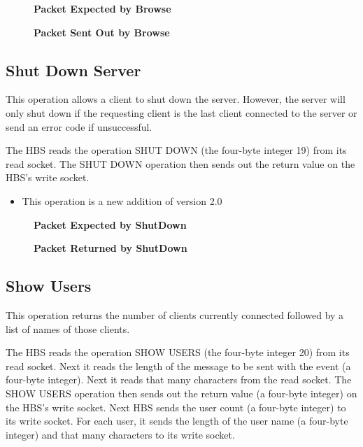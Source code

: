 \begin{figure}[htb]
  \centerline{}
  \caption{{\bf Packet Expected by Browse}}
  \label{fig:Browse1}
\end{figure}

\begin{figure}[htb]
  \centerline{}
  \caption{{\bf Packet Sent Out by Browse}}
  \label{fig:Browse2}
\end{figure}


\newpage
\subsection{Shut Down Server}

This operation allows a client to shut down the server.  However, the
server will only shut down if the requesting client is the last client
connected to the server or send an error code if unsuccessful.  

The HBS reads the operation SHUT DOWN (the four-byte integer 19) from its
read socket.  The SHUT DOWN operation then sends out the return value on
the HBS's write socket.

\begin{itemize}
\item{This operation is a new addition of version 2.0}
\end{itemize}

\begin{figure}[htb]
  \centerline{}
  \caption{{\bf Packet Expected by ShutDown}}
  \label{fig:ShutDown1}
\end{figure}


\begin{figure}[htb]
  \centerline{}
  \caption{{\bf Packet Returned by ShutDown}}
  \label{fig:ShutDown2}
\end{figure}

\newpage
\subsection{Show Users}

This operation returns the number of clients currently connected followed
by a list of names of those clients.  

The HBS reads the operation SHOW USERS (the four-byte integer 20) from its
read socket. Next it reads the length of the message to be sent with
the event (a four-byte integer).  Next it reads that many characters from
the read socket.  The SHOW USERS operation then sends out the return
value (a four-byte integer) on the HBS's write socket.  Next HBS sends the
user count (a four-byte integer) to its write socket.  For each user, it
sends the length of the user name (a four-byte integer) and that many
characters to its write socket.

